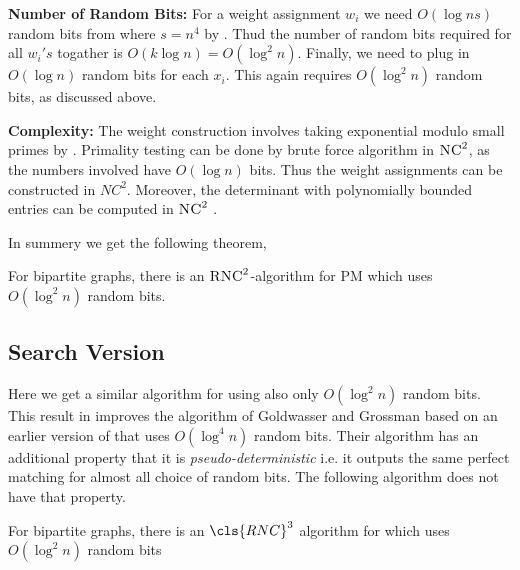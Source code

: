 \textbf{Number of Random Bits:}	For a weight assignment $w_i$ we need $O(\log ns)$ random bits from  where $s=n^4$ by . Thud the number of random bits required for all $w_i's$ togather is $O(k\log n)=O(\log^2 n)$. Finally, we need to plug in $O(\log n)$ random bits for each $x_i$. This again requires $O(\log ^2n)$ random bits, as discussed above.\vspace{3mm}

\textbf{Complexity:} The weight construction involves taking exponential modulo small primes by . Primality testing can be done by brute force algorithm in $\textsc{NC}^2$, as the numbers involved have $O(\log n)$ bits. Thus the weight assignments can be constructed in $NC^2$. Moreover, the determinant with polynomially bounded entries can be computed in $\textsc{NC}^2$ \cite{Berkowitz_1984_Oct}. \parinn

In summery we get the following theorem,

\begin{Theorem}{\cite[Theorem 4.1]{FennerGurjarThierauf_2016_Bpm_CONF}}{}
	For bipartite graphs, there is an $\textsc{RNC}^2$-algorithm for \textsc{PM} which uses $O(\log ^2 n)$ random bits.
\end{Theorem}
\subsection{Search Version}\parinn
Here we get a similar algorithm for  using also only $O(\log^2 n)$ random bits. This result in \cite{FennerGurjarThierauf_2016_Bpm_CONF} improves the  algorithm of Goldwasser and Grossman \cite{GoldwasserGrossman_2017_BPM} based on an earlier version of \cite{FennerGurjarThierauf_2016_Bpm_CONF} that uses $O(\log ^4n)$ random bits. Their  algorithm has an additional property that it is \textit{pseudo-deterministic} i.e. it outputs the same perfect matching for almost all choice of random bits. The following algorithm does not have that property.

\begin{Theorem}{}{}
	For bipartite graphs, there is an $\cls{RNC}^3$ algorithm for  which uses $O(\log^2 n)$ random bits
\end{Theorem}

